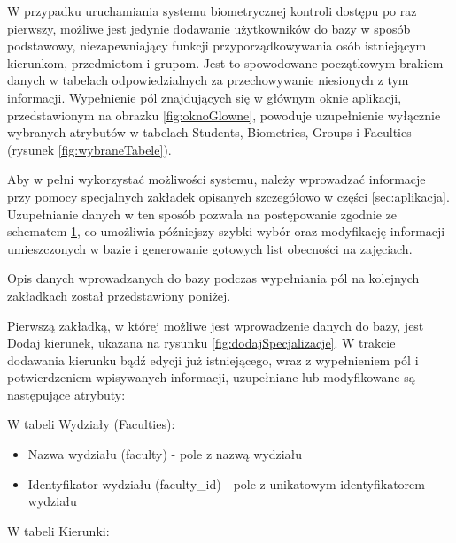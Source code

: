 \begin{figure}
\begin{center}
\label{fig:etapyDzialania}
\end{center}
\end{figure}

W przypadku uruchamiania systemu biometrycznej kontroli dostępu po raz pierwszy, możliwe jest jedynie dodawanie użytkowników do bazy w sposób podstawowy, niezapewniający funkcji przyporządkowywania osób istniejącym kierunkom, przedmiotom i grupom. Jest to spowodowane początkowym brakiem danych w tabelach odpowiedzialnych za przechowywanie niesionych z tym informacji. Wypełnienie pól znajdujących się w głównym oknie aplikacji, przedstawionym na obrazku \ref{fig:oknoGlowne}, powoduje uzupełnienie wyłącznie wybranych atrybutów w tabelach Students, Biometrics, Groups i Faculties (rysunek \ref{fig:wybraneTabele}). 

Aby w pełni wykorzystać możliwości systemu, należy wprowadzać informacje przy pomocy specjalnych zakładek opisanych szczegółowo w części \ref{sec:aplikacja}. Uzupełnianie danych w ten sposób pozwala na postępowanie zgodnie ze schematem \ref{fig:etapyDzialania}, co umożliwia późniejszy szybki wybór oraz modyfikację informacji umieszczonych w bazie i generowanie gotowych list obecności na zajęciach.

Opis danych wprowadzanych do bazy podczas wypełniania pól na kolejnych zakładkach został przedstawiony poniżej.

Pierwszą zakładką, w której możliwe jest wprowadzenie danych do bazy, jest Dodaj kierunek, ukazana na rysunku \ref{fig:dodajSpecjalizacje}. W trakcie dodawania kierunku bądź edycji już istniejącego, wraz z wypełnieniem pól i potwierdzeniem wpisywanych informacji, uzupełniane lub modyfikowane są następujące atrybuty:

W tabeli Wydziały (Faculties):

\begin{itemize}
\item Nazwa wydziału (faculty) - pole z nazwą wydziału
\item Identyfikator wydziału (faculty\_id) - pole z unikatowym identyfikatorem wydziału
\end{itemize}

W tabeli Kierunki:

